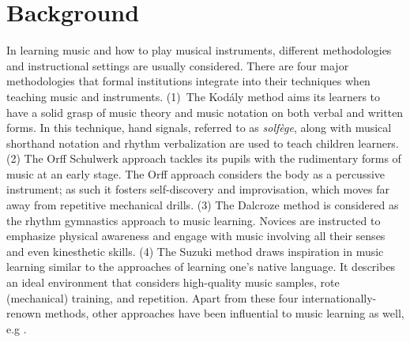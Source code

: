 \documentclass[sigconf, screen, review]{acmart}
\begin{document}
\section{Background}
In learning music and how to play musical instruments, different methodologies and instructional settings are usually considered. There are four major methodologies that formal institutions integrate into their techniques when teaching music and instruments. %
(1)~The Kodály method \cite{choksy1974kodaly} aims its learners to have a solid grasp of music theory and music notation on both verbal and written forms. In this technique, hand signals, referred to as \textit{solfège}, along with musical shorthand notation and rhythm verbalization are used to teach children learners. (2) The Orff Schulwerk \cite{shamrock1997orff} approach tackles its pupils with the rudimentary forms of music at an early stage. The Orff approach considers the body as a percussive instrument; as such it fosters self-discovery and improvisation, which moves far away from repetitive mechanical drills. (3) The Dalcroze method \cite{mead1994dalcroze} is considered as the rhythm gymnastics approach to music learning. Novices are instructed to emphasize physical awareness and engage with music involving all their senses and even kinesthetic skills. (4) The Suzuki method \cite{peak1998suzuki} draws inspiration in music learning similar to the approaches of learning one's native language. It describes an ideal environment that considers high-quality music samples, rote (mechanical) training, and repetition. Apart from these four internationally-renown methods, other approaches have been influential to music learning as well, e.g \cite{}.
\end{document}
